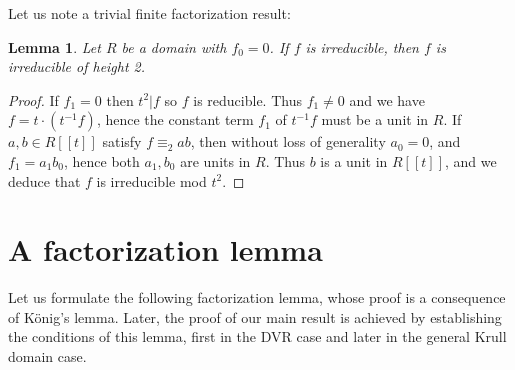 \documentclass{article}
\theoremstyle{plain}
\newtheorem{lemma}[theorem]{Lemma}
\theoremstyle{definition}
\theoremstyle{remark}
\theoremstyle{plain}
\begin{document}
Let us note a trivial finite factorization result:

\begin{lemma}\label{zero_coefficient}
    Let $R$ be a domain with $f_0 = 0$. If $f$ is irreducible, then $f$ is irreducible of height 2. 
\end{lemma}
\begin{proof}
If $f_1 = 0$ then $t^2|f$ so $f$ is reducible. Thus $f_1 \neq 0$ and we have $f = t\cdot (t^{-1}f)$, hence the constant term $f_1$ of $t^{-1}f$ must be a unit in $R$. If $a,b \in R[[t]]$ satisfy $f \equiv_2 ab$, then without loss of generality $a_0= 0$, and $f_1 = a_1b_0$, hence both $a_1,b_0$ are units in $R$. Thus $b$ is a unit in $R[[t]]$, and we deduce that $f$ is irreducible mod $t^2$.  
\end{proof}


\section{A factorization lemma}\label{sec:factorization_lemma}

Let us formulate the following factorization lemma, whose proof is a consequence of K{\"o}nig's lemma. Later, the proof of our main result is achieved by establishing the conditions of this lemma, first in the DVR case and later in the general Krull domain case. 
\end{document}
